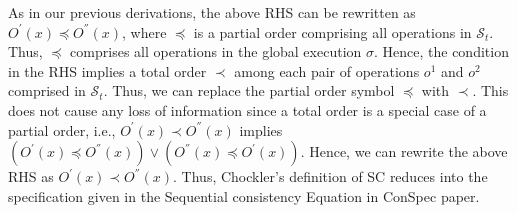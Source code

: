 \documentclass[journal,compsoc]{IEEEtran}
\begin{document}
  As in our previous derivations, the above RHS can be rewritten as ${\mathit{O}}^{'}(x)  \preccurlyeq {\mathit{O}}^{''}(x)$, where $ \preccurlyeq$ is a partial order comprising all operations in $\mathcal{S}_t$. Thus, $ \preccurlyeq$ comprises all operations in the global execution $\sigma$.
  Hence, the condition %
   in the RHS implies a total order $\prec$ among each pair of operations $\mathit{o}^1 $ and $\mathit{o}^2$ comprised in $\mathcal{S}_t$. Thus, we can replace the partial order symbol $\preccurlyeq$ with $\prec$. This does not cause any loss of information since a total order is a special case of a partial order, i.e., ${\mathit{O}}^{'}(x)  \prec {\mathit{O}}^{''}(x)$  implies $\left( {\mathit{O}}^{'}(x) \preccurlyeq {\mathit{O}}^{''}(x) \right) \vee \left( {\mathit{O}}^{''}(x)  \preccurlyeq {\mathit{O}}^{'}(x)\right)$. Hence, we can rewrite the above RHS as  ${\mathit{O}}^{'}(x)  \prec {\mathit{O}}^{''}(x) $.
  Thus, Chockler's definition of SC reduces into the specification given in the Sequential consistency  Equation in ConSpec paper.
 
\end{document}
